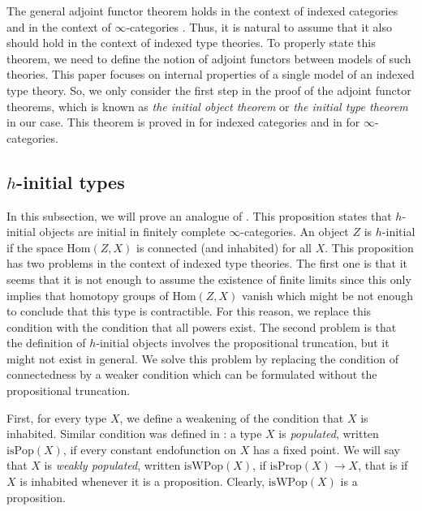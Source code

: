 \documentclass[reqno]{amsart}
\theoremstyle{definition}
\theoremstyle{remark}
\newcommand{\fs}[1]{\mathrm{#1}}
\newcommand{\Hom}{\fs{Hom}}
\numberwithin{figure}{section}
\begin{document}
The general adjoint functor theorem holds in the context of indexed categories \cite[IV.1]{indexed-cats} and in the context of $\infty$-categories \cite{infty-gaft}.
Thus, it is natural to assume that it also should hold in the context of indexed type theories.
To properly state this theorem, we need to define the notion of adjoint functors between models of such theories.
This paper focuses on internal properties of a single model of an indexed type theory.
So, we only consider the first step in the proof of the adjoint functor theorems, which is known as \emph{the initial object theorem} or \emph{the initial type theorem} in our case.
This theorem is proved in \cite[IV.1.1]{indexed-cats} for indexed categories and in \cite[Proposition~2.3.2]{infty-gaft} for $\infty$-categories.

\subsection{$h$-initial types}

In this subsection, we will prove an analogue of \cite[Proposition~2.2.2]{infty-gaft}.
This proposition states that $h$-initial objects are initial in finitely complete $\infty$-categories.
An object $Z$ is $h$-initial if the space $\Hom(Z,X)$ is connected (and inhabited) for all $X$.
This proposition has two problems in the context of indexed type theories.
The first one is that it seems that it is not enough to assume the existence of finite limits since this only implies that homotopy groups of $\Hom(Z,X)$ vanish which might be not enough to conclude that this type is contractible.
For this reason, we replace this condition with the condition that all powers exist.
The second problem is that the definition of $h$-initial objects involves the propositional truncation, but it might not exist in general.
We solve this problem by replacing the condition of connectedness by a weaker condition which can be formulated without the propositional truncation.

First, for every type $X$, we define a weakening of the condition that $X$ is inhabited.
Similar condition was defined in \cite[Definition~5]{gen-hedberg}: a type $X$ is \emph{populated}, written $\mathrm{isPop}(X)$, if every constant endofunction on $X$ has a fixed point.
We will say that $X$ is \emph{weakly populated}, written $\mathrm{isWPop}(X)$, if $\mathrm{isProp}(X) \to X$, that is if $X$ is inhabited whenever it is a proposition.
Clearly, $\mathrm{isWPop}(X)$ is a proposition.
\end{document}
